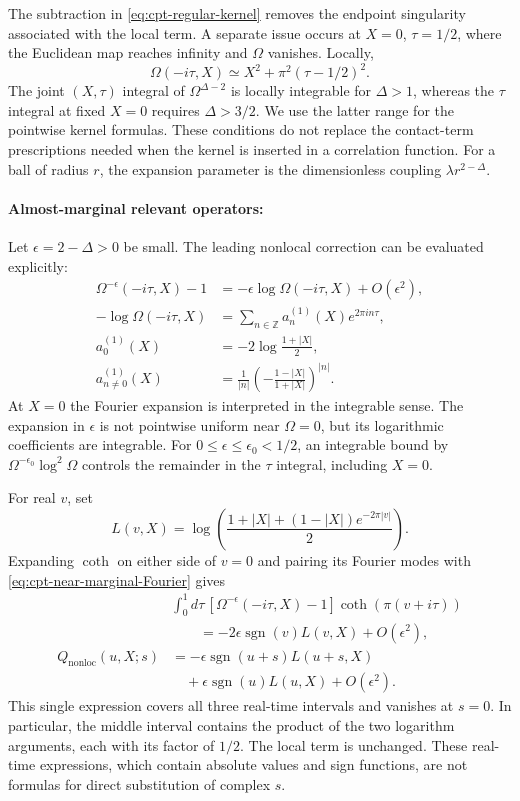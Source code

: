 \documentclass[a4paper,11pt]{article}
\theoremstyle{definition}
\begin{document}
The subtraction in \eqref{eq:cpt-regular-kernel} removes the endpoint singularity associated with the local term. A separate issue occurs at $X=0$, $\tau=1/2$, where the Euclidean map reaches infinity and $\Omega$ vanishes. Locally,
\[
 \Omega(-i\tau,X)\simeq X^2+\pi^2(\tau-1/2)^2.
\]
The joint $(X,\tau)$ integral of $\Omega^{\Delta-2}$ is locally integrable for $\Delta>1$, whereas the $\tau$ integral at fixed $X=0$ requires $\Delta>3/2$. We use the latter range for the pointwise kernel formulas. These conditions do not replace the contact-term prescriptions needed when the kernel is inserted in a correlation function. For a ball of radius $r$, the expansion parameter is the dimensionless coupling $\lambda r^{2-\Delta}$.

\paragraph{Almost-marginal relevant operators:}
Let $\epsilon=2-\Delta>0$ be small. The leading nonlocal correction can be evaluated explicitly:
\begin{align}
 \Omega^{-\epsilon}(-i\tau,X)-1
 &=-\epsilon\log\Omega(-i\tau,X)+O(\epsilon^2),\nonumber\\
 -\log\Omega(-i\tau,X)&=\sum_{n\in\mathbb Z}a_n^{(1)}(X)e^{2\pi in\tau},\nonumber\\
 a_0^{(1)}(X)&=-2\log\frac{1+|X|}{2},\nonumber\\
 a_{n\ne0}^{(1)}(X)&=\frac1{|n|}
 \left(-\frac{1-|X|}{1+|X|}\right)^{|n|}.
 \label{eq:cpt-near-marginal-Fourier}
\end{align}
At $X=0$ the Fourier expansion is interpreted in the integrable sense. The expansion in $\epsilon$ is not pointwise uniform near $\Omega=0$, but its logarithmic coefficients are integrable. For $0\leq\epsilon\leq\epsilon_0<1/2$, an integrable bound by $\Omega^{-\epsilon_0}\log^2\Omega$ controls the remainder in the $\tau$ integral, including $X=0$.

For real $v$, set
\begin{equation}
 L(v,X)=\log\left(\frac{1+|X|+(1-|X|)e^{-2\pi|v|}}{2}\right).
\end{equation}
Expanding $\coth$ on either side of $v=0$ and pairing its Fourier modes with \eqref{eq:cpt-near-marginal-Fourier} gives
\begin{align}
 &\int_0^1d\tau\,[\Omega^{-\epsilon}(-i\tau,X)-1]
 \coth(\pi(v+i\tau))\nonumber\\
 &\qquad=-2\epsilon\operatorname{sgn}(v)L(v,X)+O(\epsilon^2),\nonumber\\
 Q_{\mathrm{nonloc}}(u,X;s)
 &=-\epsilon\operatorname{sgn}(u+s)L(u+s,X)\nonumber\\
 &\quad+\epsilon\operatorname{sgn}(u)L(u,X)+O(\epsilon^2).
 \label{eq:cpt-near-marginal-Q}
\end{align}
This single expression covers all three real-time intervals and vanishes at $s=0$. In particular, the middle interval contains the product of the two logarithm arguments, each with its factor of $1/2$. The local term is unchanged. These real-time expressions, which contain absolute values and sign functions, are not formulas for direct substitution of complex $s$.
\end{document}
